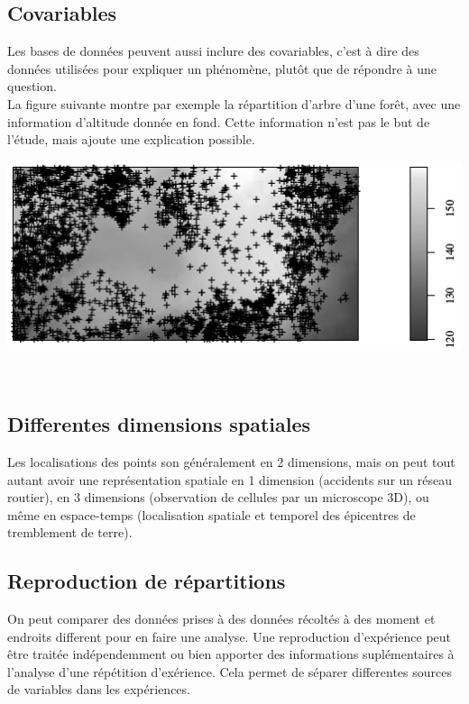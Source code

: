 \documentclass[french,12pt,a4paper]{report}
\begin{document}
\subsection{Covariables}
\begin{minipage}{0.5\linewidth}
\indent
Les bases de données peuvent aussi inclure des covariables, c'est à dire des données utilisées pour expliquer un phénomène, plutôt que de répondre à une question.\\
La figure suivante montre par exemple la répartition d'arbre d'une forêt, avec une information d'altitude donnée en fond. Cette information n'est pas le but de l'étude, mais ajoute une explication possible.
\end{minipage}\hfill
\begin{minipage}{0.5\linewidth}
\includegraphics[scale=0.5]{images/covariables.png}
\end{minipage}
\\

\subsection{Differentes dimensions spatiales}
Les localisations des points son généralement en 2 dimensions, mais on peut tout autant avoir une représentation spatiale en 1 dimension (accidents sur un réseau routier), en 3 dimensions (observation de cellules par un microscope 3D), ou même en espace-temps (localisation spatiale et temporel des épicentres de tremblement de terre).\\


\subsection{Reproduction de répartitions}
On peut comparer des données prises à des données récoltés à des moment et endroits different pour en faire une analyse. Une reproduction d'expérience peut être traitée indépendemment ou bien apporter des informations suplémentaires à l'analyse d'une répétition d'exérience. Cela permet de séparer differentes sources de variables dans les expériences.\\
\end{document}
